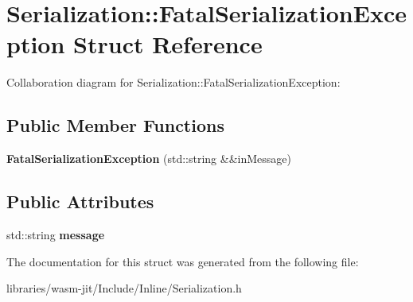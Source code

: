 \hypertarget{struct_serialization_1_1_fatal_serialization_exception}{}\section{Serialization\+:\+:Fatal\+Serialization\+Exception Struct Reference}
\label{struct_serialization_1_1_fatal_serialization_exception}


Collaboration diagram for Serialization\+:\+:Fatal\+Serialization\+Exception\+:
\subsection*{Public Member Functions}
\begin{DoxyCompactItemize}
\item 
\mbox{\label{struct_serialization_1_1_fatal_serialization_exception_ad027735c5c4b59726dfebcc627104ee9}} 
{\bfseries Fatal\+Serialization\+Exception} (std\+::string \&\&in\+Message)
\end{DoxyCompactItemize}
\subsection*{Public Attributes}
\begin{DoxyCompactItemize}
\item 
\mbox{\label{struct_serialization_1_1_fatal_serialization_exception_ae65cd23b2cf7b4f0c9a062d3584bbdde}} 
std\+::string {\bfseries message}
\end{DoxyCompactItemize}


The documentation for this struct was generated from the following file\+:\begin{DoxyCompactItemize}
\item 
libraries/wasm-\/jit/\+Include/\+Inline/Serialization.\+h\end{DoxyCompactItemize}
